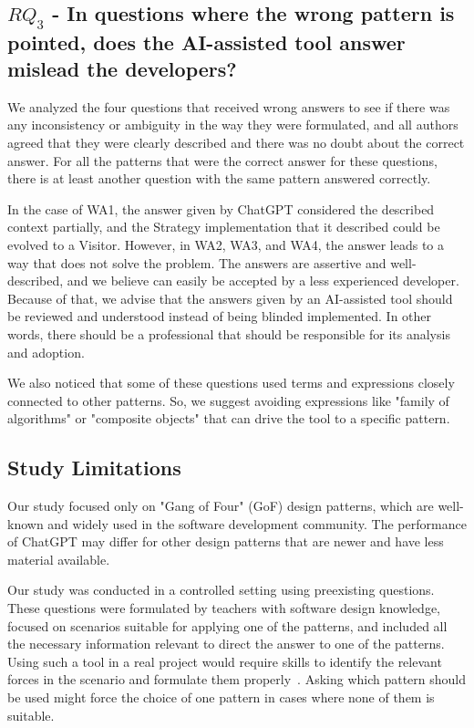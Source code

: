 \documentclass[runningheads]{llncs}
\begin{document}
\subsection{$RQ_3$ - In questions where the wrong pattern is pointed, does the AI-assisted tool answer mislead the developers?}\label{sec5sub3}

We analyzed the four questions that received wrong answers to see if there was any inconsistency or ambiguity in the way they were formulated, and all authors agreed that they were clearly described and there was no doubt about the correct answer. For all the patterns that were the correct answer for these questions, there is at least another question with the same pattern answered correctly.

In the case of WA1, the answer given by ChatGPT considered the described context partially, and the Strategy implementation that it described could be evolved to a Visitor. However, in WA2, WA3, and WA4, the answer leads to a way that does not solve the problem. The answers are assertive and well-described, and we believe can easily be accepted by a less experienced developer. Because of that, we advise that the answers given by an AI-assisted tool should be reviewed and understood instead of being blinded implemented. In other words, there should be a professional that should be responsible for its analysis and adoption.

We also noticed that some of these questions used terms and expressions closely connected to other patterns. So, we suggest avoiding expressions like "family of algorithms" or "composite objects" that can drive the tool to a specific pattern.

\subsection{Study Limitations}\label{sec5sub4}

Our study focused only on "Gang of Four" (GoF) design patterns, which are well-known and widely used in the software development community. The performance of ChatGPT may differ for other design patterns that are newer and have less material available.

Our study was conducted in a controlled setting using preexisting questions. These questions were formulated by teachers with software design knowledge, focused on scenarios suitable for applying one of the patterns, and included all the necessary information relevant to direct the answer to one of the patterns. Using such a tool in a real project would require skills to identify the relevant forces in the scenario and formulate them properly~\cite{white2023chatgpt}. Asking which pattern should be used might force the choice of one pattern in cases where none of them is suitable.
\end{document}
